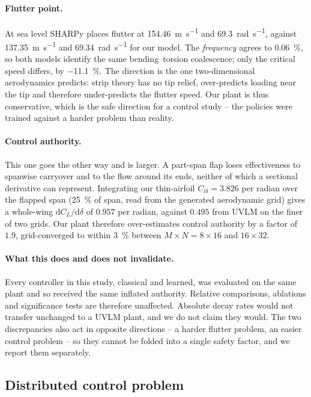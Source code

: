 \documentclass[11pt,a4paper]{article}
\begin{document}
\paragraph{Flutter point.} At sea level SHARPy places flutter at
\SI{154.46}{\metre\per\second} and \SI{69.3}{\radian\per\second}, against
\SI{137.35}{\metre\per\second} and \SI{69.34}{\radian\per\second} for our model.
The \emph{frequency} agrees to \SI{0.06}{\percent}, so both models identify the
same bending--torsion coalescence; only the critical speed differs, by
\SI{-11.1}{\percent}. The direction is the one two-dimensional aerodynamics
predicts: strip theory has no tip relief, over-predicts loading near the tip and
therefore under-predicts the flutter speed. Our plant is thus conservative, which
is the safe direction for a control study -- the policies were trained against a
harder problem than reality.

\paragraph{Control authority.} This one goes the other way and is larger. A
part-span flap loses effectiveness to spanwise carryover and to the flow around
its ends, neither of which a sectional derivative can represent. Integrating our
thin-airfoil $C_{l\delta}=3.826$ per radian over the flapped span (\SI{25}{\percent}
of span, read from the generated aerodynamic grid) gives a whole-wing
$\mathrm{d}C_L/\mathrm{d}\delta$ of $0.957$ per radian, against $0.495$ from
UVLM on the finer of two grids. Our plant therefore over-estimates control
authority by a factor of $1.9$, grid-converged to within \SI{3}{\percent}
between $M{\times}N = 8{\times}16$ and $16{\times}32$.

\paragraph{What this does and does not invalidate.} Every controller in this
study, classical and learned, was evaluated on the same plant and so received the
same inflated authority. Relative comparisons, ablations and significance tests
are therefore unaffected. Absolute decay rates would not transfer unchanged to a
UVLM plant, and we do not claim they would. The two discrepancies also act in
opposite directions -- a harder flutter problem, an easier control problem -- so
they cannot be folded into a single safety factor, and we report them separately.

\subsection{Distributed control problem}
\end{document}
